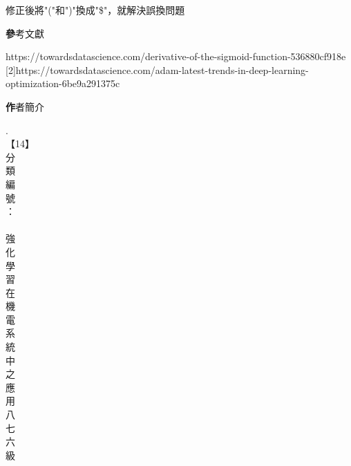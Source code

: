 \documentclass[14pt,a4paper]{report}  %
\begin{document}
修正後將"("和")"換成"\$"，就解決誤換問題
\newpage
\begin{center}
\LARGE\textbf 參考文獻\\
\end{center}
\begin{flushleft}
\begin{Large}
[1]\quad https://towardsdatascience.com/derivative-of-the-sigmoid-function-536880cf918e\\

[2]\quad https://towardsdatascience.com/adam-latest-trends-in-deep-learning-optimization-6be9a291375c\\
\end{Large}
\end{flushleft}
\newpage
\begin{center}
\LARGE\textbf 作者簡介\\
\end{center}
\newpage
\begin{center}
\fontsize{0.001pt}{1pt}\selectfont .\\
\vspace{4em}
\fontsize{30pt}{30pt}\selectfont 【14】 \\
\fontsize{20pt}{40pt}\selectfont
分\\
類\\
編\\
號\\
\hspace{-0.5em}：\\
\\ %
強\\
化\\
學\\
習\\
在\\
機\\
電\\
系\\
統\\
中\\
之\\
應\\
用\\
\vspace{2em}
八\\
七\\
六\\
級\\

\end{center}
\end{document}
